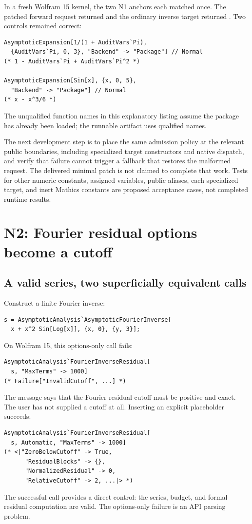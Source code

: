\documentclass[11pt,letterpaper]{article}
\newcommand{\code}[1]{\texttt{\detokenize{#1}}}
\begin{document}
In a fresh Wolfram 15 kernel, the two N1 anchors each matched once. The patched forward \code{Pi} request returned \code{Failure["InvalidVariable",...]} and the ordinary inverse target returned \code{Failure["InvalidVariables",...]}. Two controls remained correct:
\begin{lstlisting}
AsymptoticExpansion[1/(1 + AuditVars`Pi),
  {AuditVars`Pi, 0, 3}, "Backend" -> "Package"] // Normal
(* 1 - AuditVars`Pi + AuditVars`Pi^2 *)

AsymptoticExpansion[Sin[x], {x, 0, 5},
  "Backend" -> "Package"] // Normal
(* x - x^3/6 *)
\end{lstlisting}
The unqualified function names in this explanatory listing assume the package has already been loaded; the runnable artifact uses qualified names.

The next development step is to place the same admission policy at the relevant public boundaries, including specialized target constructors and native dispatch, and verify that failure cannot trigger a fallback that restores the malformed request. The delivered minimal patch is not claimed to complete that work. Tests for other numeric constants, assigned variables, public aliases, each specialized target, and inert Mathics constants are proposed acceptance cases, not completed runtime results.

\section{N2: Fourier residual options become a cutoff}
\label{sec:n2}

\subsection{A valid series, two superficially equivalent calls}

Construct a finite Fourier inverse:
\begin{lstlisting}
s = AsymptoticAnalysis`AsymptoticFourierInverse[
  x + x^2 Sin[Log[x]], {x, 0}, {y, 3}];
\end{lstlisting}
On Wolfram 15, this options-only call fails:
\begin{lstlisting}
AsymptoticAnalysis`FourierInverseResidual[
  s, "MaxTerms" -> 1000]
(* Failure["InvalidCutoff", ...] *)
\end{lstlisting}
The message says that the Fourier residual cutoff must be positive and exact. The user has not supplied a cutoff at all. Inserting an explicit placeholder succeeds:
\begin{lstlisting}
AsymptoticAnalysis`FourierInverseResidual[
  s, Automatic, "MaxTerms" -> 1000]
(* <|"ZeroBelowCutoff" -> True,
      "ResidualBlocks" -> {},
      "NormalizedResidual" -> 0,
      "RelativeCutoff" -> 2, ...|> *)
\end{lstlisting}
The successful call provides a direct control: the series, budget, and formal residual computation are valid. The options-only failure is an API parsing problem.
\end{document}
